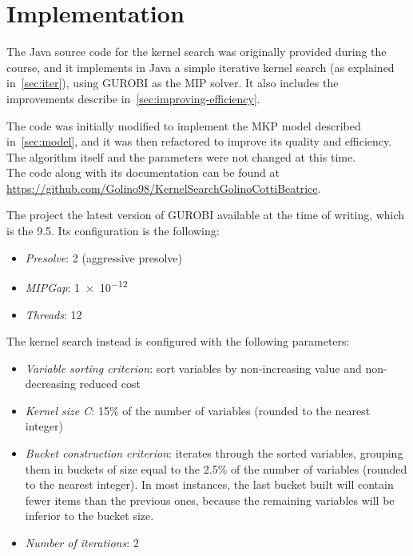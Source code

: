 \chapter{Implementation}\label{ch:implementation}
The Java source code for the kernel search was originally provided during the course,
and it implements in Java a simple iterative kernel search (as explained in~\ref{sec:iter}),
using GUROBI as the MIP solver.
It also includes the improvements describe in~\ref{sec:improving-efficiency}.

The code was initially modified to implement the MKP model described in~\ref{sec:model},
and it was then refactored to improve its quality and efficiency.
The algorithm itself and the parameters were not changed at this time.\\

The code along with its documentation can be found at
\url{https://github.com/Golino98/KernelSearchGolinoCottiBeatrice}.

The project the latest version of GUROBI available at the time of writing, which is the 9.5.
Its configuration is the following:
\begin{itemize}
    \item \textit{Presolve}: 2 (aggressive presolve)
    \item \textit{MIPGap}: \num{1e-12}
    \item \textit{Threads}: 12
\end{itemize}

The kernel search instead is configured with the following parameters:
\begin{itemize}
    \item \textit{Variable sorting criterion}: sort variables by non-increasing value and non-decreasing reduced cost
    \item \textit{Kernel size C}: 15\% of the number of variables (rounded to the nearest integer)
    \item \textit{Bucket construction criterion}: iterates through the sorted variables, grouping them in
    buckets of size equal to the 2.5\% of the number of variables (rounded to the nearest integer).
    In most instances, the last bucket built will contain fewer items than the previous ones, because the remaining
    variables will be inferior to the bucket size.
    \item \textit{Number of iterations}: 2
\end{itemize}


